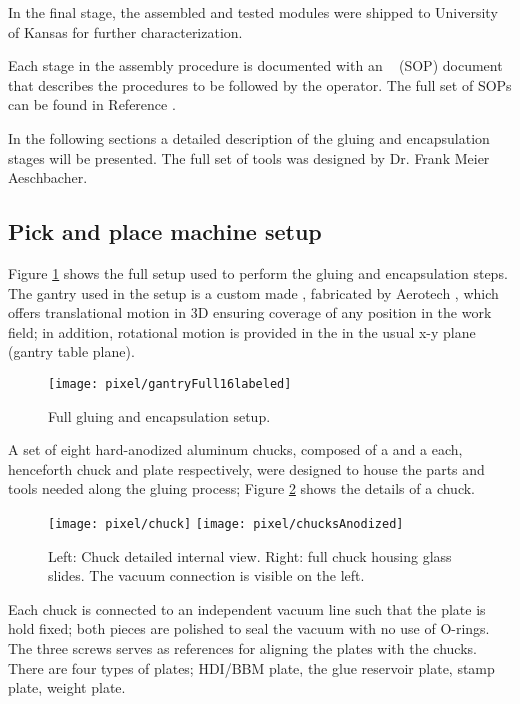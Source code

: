 In the final stage, the assembled and tested modules were shipped to University of Kansas for further characterization.  

Each stage in the assembly procedure is documented with an ~ (SOP) document that describes the procedures to be followed by the operator. The full set of SOPs can be found in Reference \cite{unl_sop}.     

In the following sections a detailed description of the gluing and encapsulation stages will be presented. The full set of tools was designed by Dr. Frank Meier Aeschbacher. 

\subsection{Pick and place machine setup}\label{sec:setup}

Figure \ref{fig:setup} shows the full setup used to perform the gluing and encapsulation steps. The gantry used in the setup is a custom made , fabricated by Aerotech \cite{aerotech}, which offers translational motion in 3D ensuring coverage of any position in the work field; in addition, rotational motion is provided in the  in the usual x-y plane (gantry table plane).

\begin{figure}[!h]
  \centering
  \texttt{[image: pixel/gantryFull16labeled]}
  \caption[Full gluing and encapsulation setup]{Full gluing and encapsulation setup. }\label{fig:setup}
\end{figure}

A set of eight hard-anodized aluminum chucks, composed of a  and a  each, henceforth chuck and plate respectively, were designed to house the parts and tools needed along the gluing process; Figure \ref{fig:chuck} shows the details of a chuck.      

\begin{figure}[!h]
  \centering
  \texttt{[image: pixel/chuck]}
  \texttt{[image: pixel/chucksAnodized]}
  \caption[Bare and full chucks]{Left: Chuck detailed internal view. Right: full chuck housing glass slides. The vacuum connection is visible on the left.}\label{fig:chuck}
\end{figure}

Each chuck is connected to an independent vacuum line such that the plate is hold fixed; both pieces are polished to seal the vacuum with no use of O-rings. The three screws serves as references for aligning the plates with the chucks. There are four types of plates; HDI/BBM plate, the glue reservoir plate, stamp plate, weight plate.

